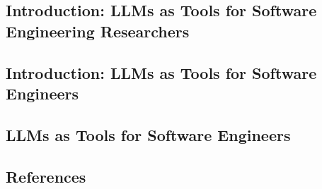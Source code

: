 



\subsection{Introduction: LLMs as Tools for Software Engineering Researchers}
\label{sec:llms-as-tools-for-software-engineering-researchers}









\subsection{Introduction: LLMs as Tools for Software Engineers}
\label{sec:llms-as-tools-for-software-engineers}

\subsection{LLMs as Tools for Software Engineers}
\label{sec:llms-as-tools-for-software-engineers}









\subsection{References}





